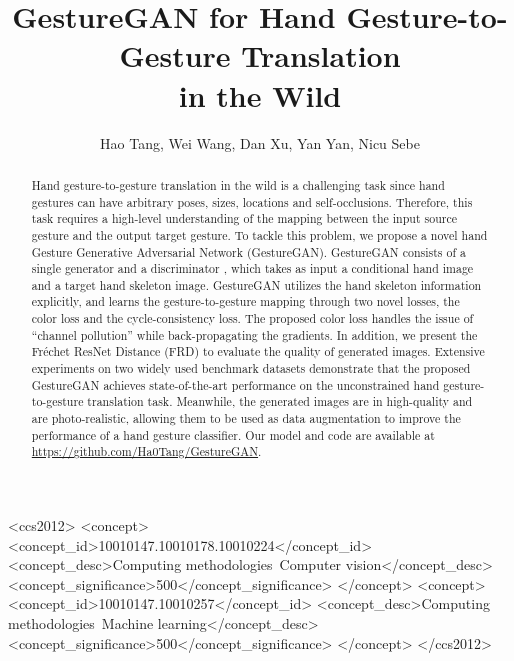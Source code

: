 \documentclass[sigconf]{acmart}
\begin{document}
\title{GestureGAN for Hand Gesture-to-Gesture Translation\\ in the Wild}

\author{Hao Tang, \quad Wei Wang, \quad Dan Xu, \quad Yan Yan, \quad Nicu Sebe}

\begin{abstract}
	
Hand gesture-to-gesture translation in the wild is a challenging task since hand gestures can have arbitrary poses, sizes, locations and self-occlusions. 
Therefore, this task requires a high-level understanding of the mapping between the input source gesture and the output target gesture.
To tackle this problem, we propose a novel hand Gesture Generative Adversarial Network (GestureGAN). 
GestureGAN consists of a single generator  and a discriminator , which takes as input a conditional hand image and a target hand skeleton image. 
GestureGAN utilizes the hand skeleton information explicitly, and learns the gesture-to-gesture mapping through two novel losses, the color loss and the cycle-consistency loss. 
The proposed color loss handles the issue of ``channel pollution'' while back-propagating the gradients.
In addition, we present the Fr\'echet ResNet Distance (FRD) to evaluate the quality of generated images.
Extensive experiments on two widely used benchmark datasets demonstrate that the proposed GestureGAN achieves state-of-the-art performance on the unconstrained hand gesture-to-gesture translation task. 
Meanwhile, the generated images are in high-quality and are photo-realistic, allowing them to be used as data augmentation to improve the performance of a hand gesture classifier. 
Our model and code are available at \url{https://github.com/Ha0Tang/GestureGAN}.
	
\end{abstract}

\begin{CCSXML}
	<ccs2012>
	<concept>
	<concept_id>10010147.10010178.10010224</concept_id>
	<concept_desc>Computing methodologies~Computer vision</concept_desc>
	<concept_significance>500</concept_significance>
	</concept>
	<concept>
	<concept_id>10010147.10010257</concept_id>
	<concept_desc>Computing methodologies~Machine learning</concept_desc>
	<concept_significance>500</concept_significance>
	</concept>
	</ccs2012>
\end{CCSXML}
\end{document}
